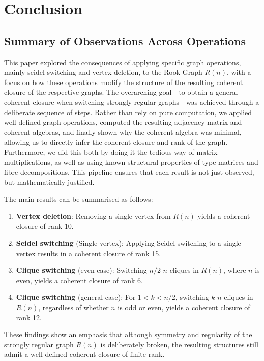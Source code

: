\section{Conclusion}
\subsection{Summary of Observations Across Operations}

This paper explored the consequences of applying specific graph operations, mainly seidel switching and vertex deletion, to the Rook Graph $R(n)$, with a focus on how these operations modify the structure of the resulting coherent closure of the respective graphs. The overarching goal - to obtain a general coherent closure when switching strongly regular graphs - was achieved through a deliberate sequence of steps. Rather than rely on pure computation, we applied well-defined graph operations, computed the resulting adjacency matrix and coherent algebras, and finally shown why the coherent algebra was minimal, allowing us to directly infer the coherent closure and rank of the graph. Furthermore, we did this both by doing it the tedious way of matrix multiplications, as well as using known structural properties of type matrices and fibre decompositions. This pipeline ensures that each result is not just observed, but mathematically justified.

The main results can be summarised as follows:
\begin{enumerate}
    \item \textbf{Vertex deletion}: Removing a single vertex from $R(n)$ yields a coherent closure of rank 10.

    \item \textbf{Seidel switching} (Single vertex): Applying Seidel switching to a single vertex results in a coherent closure of rank 15.

    \item \textbf{Clique switching} (even case): Switching $n/2$ $n$-cliques in $R(n)$, where $n$ is even, yields a coherent closure of rank 6.

    \item \textbf{Clique switching} (general case): For $1<k<n/2$, switching $k$ $n$-cliques in $R(n)$, regardless of whether $n$ is odd or even, yields a coherent closure of rank 12.
\end{enumerate}

These findings show an emphasis that although symmetry and regularity of the strongly regular graph $R(n)$ is deliberately broken, the resulting structures still admit a well-defined coherent closure of finite rank. 
